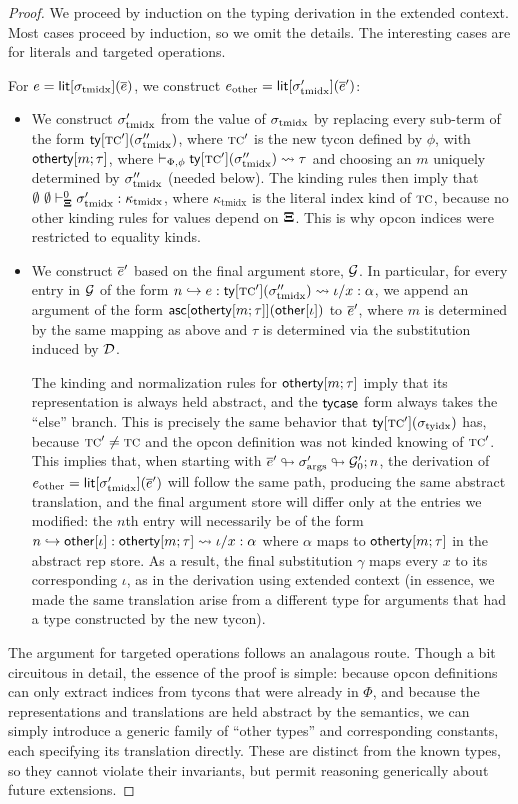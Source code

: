 \documentclass[9pt,preprint]{sigplanconf}
\begin{document}
\begin{proof}We proceed by induction on the typing derivation in the extended context. Most cases proceed by induction, so we omit the details. The interesting cases are for literals and targeted operations.

For $e={\sf lit}[\sigma_\text{tmidx}](\overline{e})$, we construct $e_\text{other}={\sf lit}[\sigma_\text{tmidx}'](\overline{e}')$:
\begin{itemize}
\item We construct $\sigma_\text{tmidx}'$ from the value of $\sigma_\text{tmidx}$ by replacing every sub-term of the form ${\sf ty}[\textsc{tc}'](\sigma_\text{tmidx}'')$, where $\textsc{tc}'$ is the new tycon defined by $\phi$, with ${\sf otherty}[m; \tau]$, where $\vdash_{\Phi, \phi} {\sf ty}[\textsc{tc}'](\sigma_\text{tmidx}'') \leadsto \tau$ and choosing an $m$ uniquely determined by $\sigma_\text{tmidx}''$ (needed below). The kinding rules then imply that $\emptyset~\emptyset \vdash_{\boldsymbol\Xi}^{0} \sigma_\text{tmidx}' : \kappa_\text{tmidx}$, where $\kappa_\text{tmidx}$ is the literal index kind of $\textsc{tc}$, because no other kinding rules for values depend on $\boldsymbol\Xi$. This is why opcon indices were restricted to equality kinds.
\item We construct $\overline{e}'$ based on the final argument store, $\mathcal{G}$. In particular, for every entry in $\mathcal{G}$ of the form $n \hookrightarrow e : {\sf ty}[\textsc{tc}'](\sigma_\text{tmidx}'') \leadsto \iota/x : \alpha$, we append an argument of the form  ${\sf asc}[{\sf otherty}[m; \tau]]({\sf other}[\iota])$ to $\overline{e}'$, where $m$ is determined by the same mapping as above and $\tau$ is determined via the substitution induced by $\mathcal{D}$. 

The kinding and normalization rules for ${\sf otherty}[m; \tau]$ imply that its representation is always held abstract, and the ${\sf tycase}$ form always takes the ``else'' branch. This is precisely the same behavior that ${\sf ty}[\textsc{tc}'](\sigma_\text{tyidx})$ has, because $\textsc{tc}' \neq \textsc{tc}$ and the opcon definition was not kinded knowing of $\textsc{tc}'$. This implies that, when starting with $\overline{e}' \looparrowright \sigma_\text{args}' \looparrowright \mathcal{G}_0'; n$, the derivation of $e_\text{other}={\sf lit}[\sigma_\text{tmidx}'](\overline{e}')$ will follow the same path, producing the same abstract translation, and the final argument store will differ only at the entries we modified: the $n$th entry will necessarily be of the form $n \hookrightarrow {{\sf other}[\iota]} : {{\sf otherty}[m; \tau]} \leadsto \iota/x : \alpha$ where $\alpha$ maps to ${\sf otherty}[m; \tau]$ in the abstract rep store. As a result, the final substitution $\gamma$ maps every $x$ to its corresponding $\iota$, as in the derivation using extended context (in essence, we made the same translation arise from a different type for arguments that had a type constructed by the new tycon).
\end{itemize}
The argument for targeted operations follows an analagous route. Though a bit circuitous in detail, the essence of the proof is simple: because opcon definitions can only extract indices from  tycons that were already in $\Phi$, and because the representations and translations are held abstract by the semantics, we can simply introduce a generic family of ``other types'' and corresponding constants, each specifying its translation directly. These are distinct from the known types, so they cannot violate their invariants, but permit reasoning generically about future extensions.
\end{proof}
\end{document}
